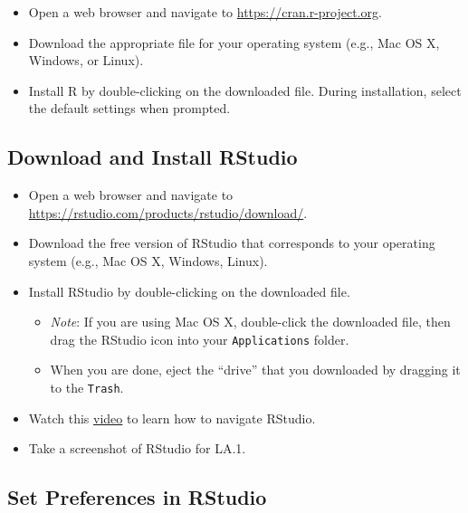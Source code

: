 \documentclass[
]{article}
\providecommand{\tightlist}{%
  \setlength{\itemsep}{0pt}\setlength{\parskip}{0pt}}
\begin{document}
\begin{itemize}
\tightlist
\item
  Open a web browser and navigate to
  \href{https://cran.r-project.org/}{https://cran.r-project.org}.
\item
  Download the appropriate file for your operating system (e.g., Mac OS
  X, Windows, or Linux).
\item
  Install R by double-clicking on the downloaded file. During
  installation, select the default settings when prompted.
\end{itemize}

\hypertarget{download-and-install-rstudio}{%
\subsection{Download and Install
RStudio}\label{download-and-install-rstudio}}

\begin{itemize}
\tightlist
\item
  Open a web browser and navigate to
  \url{https://rstudio.com/products/rstudio/download/}.
\item
  Download the free version of RStudio that corresponds to your
  operating system (e.g., Mac OS X, Windows, Linux).
\item
  Install RStudio by double-clicking on the downloaded file.

  \begin{itemize}
  \tightlist
  \item
    \emph{Note}: If you are using Mac OS X, double-click the downloaded
    file, then drag the RStudio icon into your \texttt{Applications}
    folder.
  \item
    When you are done, eject the ``drive'' that you downloaded by
    dragging it to the \texttt{Trash}.
  \end{itemize}
\item
  Watch this
  \href{https://rstudio.com/products/rstudio/?wvideo=520zbd3tij}{video}
  to learn how to navigate RStudio.
\item
  Take a screenshot of RStudio for LA.1.
\end{itemize}

\hypertarget{set-preferences-in-rstudio}{%
\subsection{Set Preferences in
RStudio}\label{set-preferences-in-rstudio}}
\end{document}
